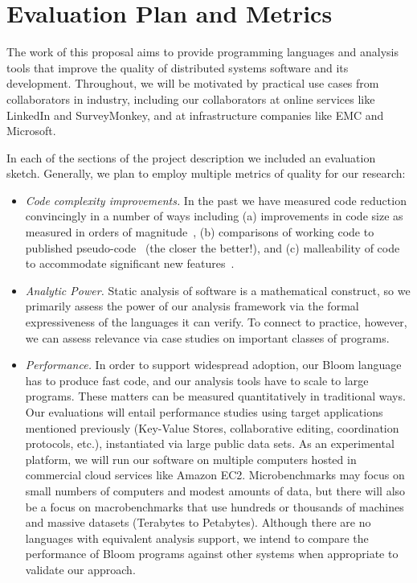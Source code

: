 \section{Evaluation Plan and Metrics}
The work of this proposal aims to provide programming languages and analysis tools that improve the quality of distributed systems software and its development.  Throughout, we will be motivated by practical use cases from collaborators in industry, including our collaborators at online services like LinkedIn and SurveyMonkey, and at infrastructure companies like EMC and Microsoft.

In each of the sections of the project description we included an evaluation sketch.  Generally, we plan to employ multiple metrics of quality for our research: 
\begin{itemize}
\item \emph{Code complexity improvements.}  In the past we have measured code reduction convincingly in a number of ways including (a) improvements in code size as measured in orders of magnitude~\cite{boom-eurosys,p2}, (b) comparisons of working code to published pseudo-code~\cite{boom-eurosys,netdb} (the closer the better!), and (c) malleability of code to accommodate significant new features~\cite{boom-eurosys}.  

\item \emph{Analytic Power.}  Static analysis of software is a mathematical construct, so we primarily assess the power of our analysis framework via the formal expressiveness of the languages it can verify.  To connect to practice, however, we can assess relevance via case studies on important classes of programs.

\item \emph{Performance.}  In order to support widespread adoption, our Bloom language has to produce fast code, and our analysis tools have to scale to large programs.  These matters can be measured quantitatively in  traditional ways.  Our evaluations will entail performance studies using target applications mentioned previously  (Key-Value Stores, collaborative editing, coordination protocols, etc.), instantiated via large public data sets.  As an experimental platform, we will run our software on multiple computers hosted in commercial cloud services like Amazon EC2.  Microbenchmarks may focus on small numbers of computers and modest amounts of data, but there will also be a focus on macrobenchmarks that use hundreds or thousands of machines and massive datasets (Terabytes to Petabytes).  Although there are no languages with equivalent analysis support, we intend to compare the performance of Bloom programs against other systems when appropriate to validate our approach. 
\end{itemize}

